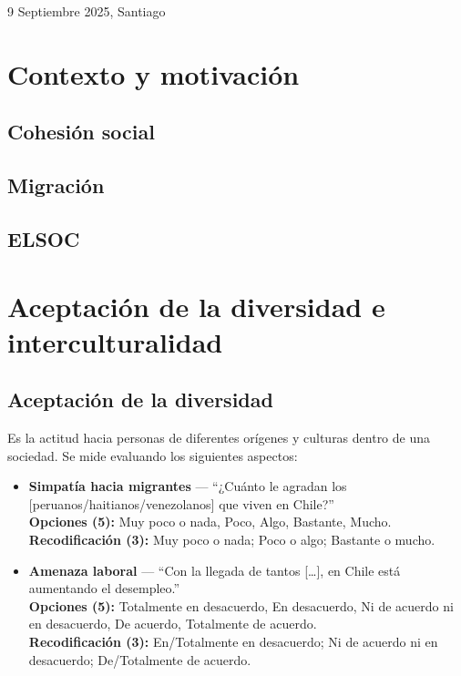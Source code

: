 \documentclass[
  spanish,
  letterpaper,
  DIV=11,
  numbers=noendperiod,
  oneside]{scrartcl}
\begin{document}
9 Septiembre 2025, Santiago

\section{Contexto y motivación}\label{contexto-y-motivaciuxf3n}

\subsection{Cohesión social}\label{cohesiuxf3n-social}

\subsection{Migración}\label{migraciuxf3n}

\subsection{ELSOC}\label{elsoc}

\section{Aceptación de la diversidad e
interculturalidad}\label{aceptaciuxf3n-de-la-diversidad-e-interculturalidad}

\subsection{Aceptación de la
diversidad}\label{aceptaciuxf3n-de-la-diversidad}

Es la actitud hacia personas de diferentes orígenes y culturas dentro de
una sociedad. Se mide evaluando los siguientes aspectos:

\begin{itemize}
\item
  \textbf{Simpatía hacia migrantes} --- ``¿Cuánto le agradan los
  {[}peruanos/haitianos/venezolanos{]} que viven en Chile?''\\
  \textbf{Opciones (5):} Muy poco o nada, Poco, Algo, Bastante, Mucho.\\
  \textbf{Recodificación (3):} Muy poco o nada; Poco o algo; Bastante o
  mucho.
\item
  \textbf{Amenaza laboral} --- ``Con la llegada de tantos {[}\ldots{]},
  en Chile está aumentando el desempleo.''\\
  \textbf{Opciones (5):} Totalmente en desacuerdo, En desacuerdo, Ni de
  acuerdo ni en desacuerdo, De acuerdo, Totalmente de acuerdo.\\
  \textbf{Recodificación (3):} En/Totalmente en desacuerdo; Ni de
  acuerdo ni en desacuerdo; De/Totalmente de acuerdo.
\end{itemize}
\end{document}
